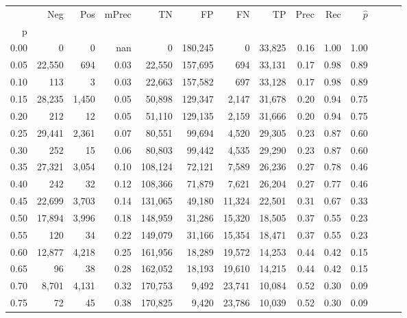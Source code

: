\begin{tabular}{rrrrrrrrrrrrrr}
\toprule
{} &     Neg &    Pos & mPrec &       TN &       FP &      FN &      TP &  Prec &   Rec & $\hat{p}$ \\
p    &         &        &       &          &          &         &         &       &       &           \\
\midrule
0.00 &       0 &      0 &   nan &        0 &  180,245 &       0 &  33,825 &  0.16 &  1.00 &      1.00 \\
0.05 &  22,550 &    694 &  0.03 &   22,550 &  157,695 &     694 &  33,131 &  0.17 &  0.98 &      0.89 \\
0.10 &     113 &      3 &  0.03 &   22,663 &  157,582 &     697 &  33,128 &  0.17 &  0.98 &      0.89 \\
0.15 &  28,235 &  1,450 &  0.05 &   50,898 &  129,347 &   2,147 &  31,678 &  0.20 &  0.94 &      0.75 \\
0.20 &     212 &     12 &  0.05 &   51,110 &  129,135 &   2,159 &  31,666 &  0.20 &  0.94 &      0.75 \\
0.25 &  29,441 &  2,361 &  0.07 &   80,551 &   99,694 &   4,520 &  29,305 &  0.23 &  0.87 &      0.60 \\
0.30 &     252 &     15 &  0.06 &   80,803 &   99,442 &   4,535 &  29,290 &  0.23 &  0.87 &      0.60 \\
0.35 &  27,321 &  3,054 &  0.10 &  108,124 &   72,121 &   7,589 &  26,236 &  0.27 &  0.78 &      0.46 \\
0.40 &     242 &     32 &  0.12 &  108,366 &   71,879 &   7,621 &  26,204 &  0.27 &  0.77 &      0.46 \\
0.45 &  22,699 &  3,703 &  0.14 &  131,065 &   49,180 &  11,324 &  22,501 &  0.31 &  0.67 &      0.33 \\
0.50 &  17,894 &  3,996 &  0.18 &  148,959 &   31,286 &  15,320 &  18,505 &  0.37 &  0.55 &      0.23 \\
0.55 &     120 &     34 &  0.22 &  149,079 &   31,166 &  15,354 &  18,471 &  0.37 &  0.55 &      0.23 \\
0.60 &  12,877 &  4,218 &  0.25 &  161,956 &   18,289 &  19,572 &  14,253 &  0.44 &  0.42 &      0.15 \\
0.65 &      96 &     38 &  0.28 &  162,052 &   18,193 &  19,610 &  14,215 &  0.44 &  0.42 &      0.15 \\
0.70 &   8,701 &  4,131 &  0.32 &  170,753 &    9,492 &  23,741 &  10,084 &  0.52 &  0.30 &      0.09 \\
0.75 &      72 &     45 &  0.38 &  170,825 &    9,420 &  23,786 &  10,039 &  0.52 &  0.30 &      0.09 \\

\end{tabular}
